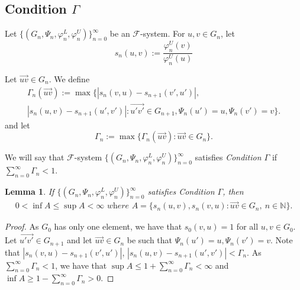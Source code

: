 \documentclass[11pt]{amsart}
\newtheorem{lemma}[theorem]{Lemma}
\newcommand{\N}{\mathbb{N}}  %
\newcommand{\oa}{\overrightarrow}
\newcommand{\cF}{\mathcal{F}}
\newcommand{\fsystem}{\{(G_n, \Psi_n,\varphi^L_n,\varphi^U_n)\}_{n=0}^{\infty}}
\begin{document}
{\subsection{Condition $\Gamma$}

Let $\fsystem$ be an $\cF$-system. %
For  $u, v \in G_n$, let 
\begin{equation}
s_n(u, v):= \frac{\varphi^U_n(v)}{\varphi^U_n(u)}
\end{equation}

Let $\oa{uv}\in G_n$. We define 
\begin{equation}\label{def:Fgamma_n}
\begin{split}
\Gamma_n(\oa{uv}):=  \max\Biggl\{ \left | s_n(v,u)  - s_{n+1}(v',u') \right | ,\\ \left | s_n(u,v)  - s_{n+1}(u',v')\right | : 
\oa{u'v'}\in G_{n+1}, \Psi_n(u')=u,  \Psi_n(v')=v\Biggl\}. 
\end{split}
\end{equation}
and let 
\begin{equation}\label{eq:gamma}
\Gamma_n:=\max\{\Gamma_n(\oa{uv}):  \oa{uv}\in G_n\}.
\end{equation}

We will say that $\cF$-system $\fsystem$ satisfies \emph{Condition $\Gamma$} if $\sum^{\infty}_{n=0} \Gamma_n < 1$.


\begin{lemma}\label{lem:bounded}
    If $\fsystem$ satisfies Condition $\Gamma$, then
    \begin{equation}\label{eq:AboundedF} 
    \begin{split}
  0< \inf A \leq \sup A < \infty   \textit{ where } 
 A=\Bigg\{  s_n(u,v), s_n(v,u): \oa{uv}\in G_n,\  n \in \N\Bigg\}.
    \end{split}
\end{equation}
\end{lemma}
\begin{proof}
As $G_0$ has only one element, we have that $s_0(v,u)=1$ for all $u, v \in G_0$. Let $\oa{u'v'} \in G_{n+1}$ and let $\oa{uv} \in G_{n}$ be such that $\Psi_n(u')=u,  \Psi_n(v')=v$. Note that $\left | s_n(v,u)  - s_{n+1}(v',u') \right |$, $\left | s_n(u,v)  - s_{n+1}(u', v') \right | < \Gamma_n$. As   $\sum_{n=0}^{\infty}\Gamma_n< 1$, we have that $\sup A \le 1 + \sum_{n=0}^{\infty} \Gamma_n < \infty$ and $\inf A \ge 1 - \sum_{n=0}^{\infty} \Gamma_n >0 $. 
\end{proof}

}
\end{document}
